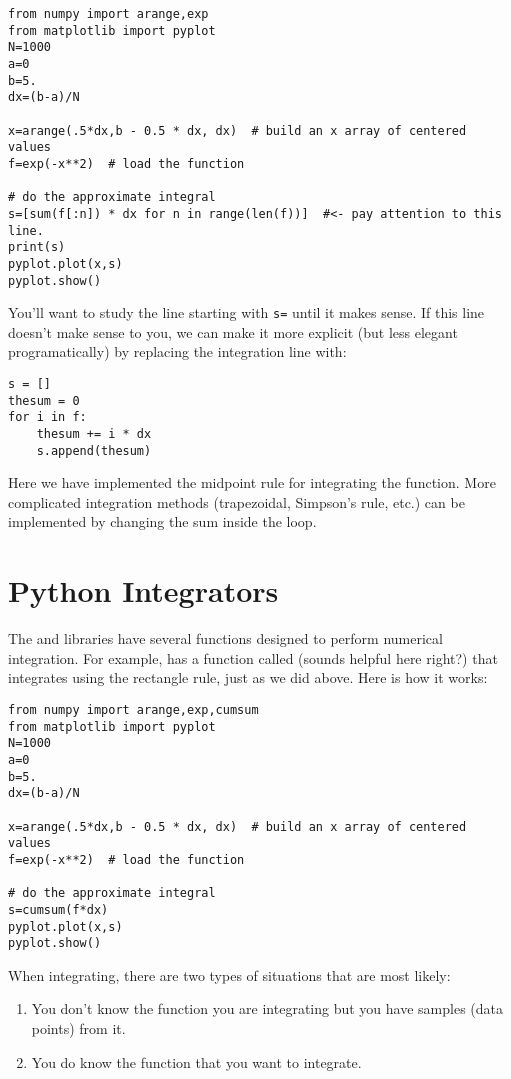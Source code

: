 \begin{Verbatim}
from numpy import arange,exp
from matplotlib import pyplot
N=1000
a=0
b=5.
dx=(b-a)/N

x=arange(.5*dx,b - 0.5 * dx, dx)  # build an x array of centered values
f=exp(-x**2)  # load the function

# do the approximate integral
s=[sum(f[:n]) * dx for n in range(len(f))]  #<- pay attention to this line.
print(s)
pyplot.plot(x,s)
pyplot.show()
\end{Verbatim}
You'll want to study the line starting with \verb!s=! until it makes
sense.  If this line doesn't make sense to you, we can make it more
explicit (but less elegant programatically) by replacing the
integration line with:
\begin{Verbatim}
s = []
thesum = 0
for i in f:
    thesum += i * dx
    s.append(thesum)
\end{Verbatim}

Here we have implemented the midpoint rule for integrating the function.
More complicated integration methods (trapezoidal, Simpson's rule,
etc.) can be implemented by changing the sum inside the loop.

\section{Python Integrators}
The  and  libraries have several functions
designed to perform numerical integration. For example, 
has a function called  (sounds helpful here right?) that
integrates using the rectangle rule, just as we did above. Here is how
it works:

\begin{Verbatim}
from numpy import arange,exp,cumsum
from matplotlib import pyplot
N=1000
a=0
b=5.
dx=(b-a)/N

x=arange(.5*dx,b - 0.5 * dx, dx)  # build an x array of centered values
f=exp(-x**2)  # load the function

# do the approximate integral
s=cumsum(f*dx)
pyplot.plot(x,s)
pyplot.show()
\end{Verbatim}

When integrating, there
are two types of situations that are most likely:
\begin{enumerate}

\item You don't know the
function you are integrating but you have samples (data points) from it.
\item You do know the
function that you want to integrate.
\end{enumerate}





